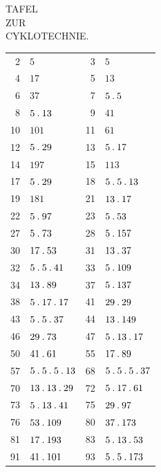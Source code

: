 \clearpage
{}%
\renewcommand{\BookRunningTitle}{Tafel zur Cyklotechnie}
\begin{center}
{\large TAFEL}\\[3pt]
{ZUR}\\[3pt]
{CYKLOTECHNIE.}
\end{center}
%
\renewcommand{\BookRunningTitle}{Tafel zur Cyklotechnie}
\begingroup\small\setlength{\tabcolsep}{4pt}
\begin{longtable}{@{}r|l@{\qquad}r|l@{}}
2 & $5$ & 3 & $5$\\
4 & $17$ & 5 & $13$\\
6 & $37$ & 7 & $5\mathbin{.} 5$\\
8 & $5\mathbin{.} 13$ & 9 & $41$\\
10 & $101$ & 11 & $61$\\
12 & $5\mathbin{.} 29$ & 13 & $5\mathbin{.} 17$\\
14 & $197$ & 15 & $113$\\
17 & $5\mathbin{.} 29$ & 18 & $5\mathbin{.} 5\mathbin{.} 13$\\
19 & $181$ & 21 & $13\mathbin{.} 17$\\
22 & $5\mathbin{.} 97$ & 23 & $5\mathbin{.} 53$\\
27 & $5\mathbin{.} 73$ & 28 & $5\mathbin{.} 157$\\
30 & $17\mathbin{.} 53$ & 31 & $13\mathbin{.} 37$\\
32 & $5\mathbin{.} 5\mathbin{.} 41$ & 33 & $5\mathbin{.} 109$\\
34 & $13\mathbin{.} 89$ & 37 & $5\mathbin{.} 137$\\
38 & $5\mathbin{.} 17\mathbin{.} 17$ & 41 & $29\mathbin{.} 29$\\
43 & $5\mathbin{.} 5\mathbin{.} 37$ & 44 & $13\mathbin{.} 149$\\
46 & $29\mathbin{.} 73$ & 47 & $5\mathbin{.} 13\mathbin{.} 17$\\
50 & $41\mathbin{.} 61$ & 55 & $17\mathbin{.} 89$\\
57 & $5\mathbin{.} 5\mathbin{.} 5\mathbin{.} 13$ & 68 & $5\mathbin{.} 5\mathbin{.} 5\mathbin{.} 37$\\
70 & $13\mathbin{.} 13\mathbin{.} 29$ & 72 & $5\mathbin{.} 17\mathbin{.} 61$\\
73 & $5\mathbin{.} 13\mathbin{.} 41$ & 75 & $29\mathbin{.} 97$\\
76 & $53\mathbin{.} 109$ & 80 & $37\mathbin{.} 173$\\
81 & $17\mathbin{.} 193$ & 83 & $5\mathbin{.} 13\mathbin{.} 53$\\
91 & $41\mathbin{.} 101$ & 93 & $5\mathbin{.} 5\mathbin{.} 173$\\

\end{longtable}
